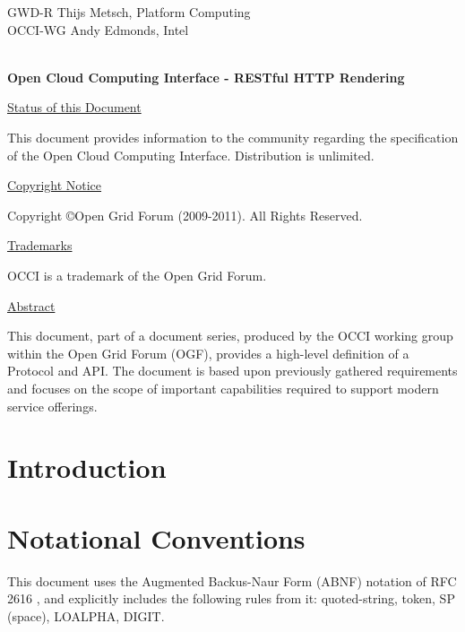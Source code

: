 \documentclass[10pt,a4paper]{article}
\begin{document}
\thispagestyle{empty}

GWD-R \hfill Thijs Metsch, Platform Computing\\
OCCI-WG \hfill Andy Edmonds, Intel\\
\\

\vspace*{0.5in}

\begin{Large}
\textbf{Open Cloud Computing Interface - RESTful HTTP Rendering}
\end{Large}

\vspace*{0.5in}

\underline{Status of this Document}

This document provides information to the community regarding the
specification of the Open Cloud Computing Interface. Distribution is
unlimited.

\underline{Copyright Notice}

Copyright \copyright Open Grid Forum (2009-2011). All Rights Reserved.

\underline{Trademarks}

OCCI is a trademark of the Open Grid Forum.

\underline{Abstract}

This document, part of a document series, produced by the OCCI working
group within the Open Grid Forum (OGF), provides a high-level
definition of a Protocol and API. The document is based upon
previously gathered requirements and focuses on the scope of important
capabilities required to support modern service offerings.

\newpage
\tableofcontents
\newpage

\section{Introduction}


\section{Notational Conventions}


This document uses the Augmented Backus-Naur Form (ABNF) notation of
RFC 2616 \cite{rfc2616}, and explicitly includes the following rules
from it: quoted-string, token, SP (space), LOALPHA, DIGIT.
\end{document}
